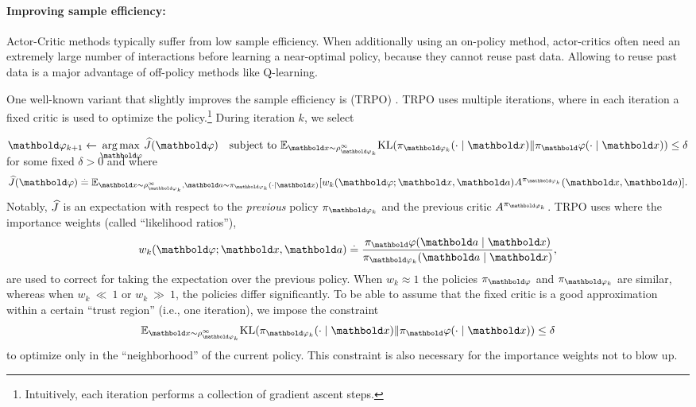 \paragraph{Improving sample efficiency:}

Actor-Critic methods typically suffer from low sample efficiency.
When additionally using an on-policy method, actor-critics often need an extremely large number of interactions before learning a near-optimal policy, because they cannot reuse past data.
Allowing to reuse past data is a major advantage of off-policy methods like Q-learning.

One well-known variant that slightly improves the sample efficiency is  (TRPO) \citep{schulman2015trust}.
TRPO uses multiple iterations, where in each iteration a fixed critic is used to optimize the policy.\footnote{Intuitively, each iteration performs a collection of gradient ascent steps.}
During iteration $k$, we select \begin{align}
  \vvarphi_{k+1} \gets \argmax_{\vvarphi} \J{\vvarphi} \quad \text{subject to}\ \E*[\vx \sim \rho_{\vvarphi_k}^\infty]{\KL{\pi_{\vvarphi_k}(\cdot \mid \vx)}{\pi_\vvarphi(\cdot \mid \vx)}} \leq \delta \label{eq:trpo} \\[-35pt] \nonumber
\end{align} for some fixed $\delta > 0$ and where \begin{align}
  \J{\vvarphi} \defeq \E[\vx \sim \rho_{\vvarphi_k}^\infty, \va \sim \pi_{\vvarphi_k}(\cdot \mid \vx)]{w_k(\vvarphi; \vx, \va) \A[\pi_{\vvarphi_k}]{\vx}{\va}}.
\end{align}
Notably, $\fnJ$ is an expectation with respect to the \emph{previous} policy $\pi_{\vvarphi_k}$ and the previous critic $\fnA[\pi_{\vvarphi_k}]$.
TRPO uses  where the importance weights (called ``likelihood ratios''), \begin{align*}
  w_k(\vvarphi; \vx, \va) \defeq \frac{\pi_\vvarphi(\va \mid \vx)}{\pi_{\vvarphi_k}(\va \mid \vx)},
\end{align*} are used to correct for taking the expectation over the previous policy.
When $w_k \approx 1$ the policies $\pi_{\vvarphi}$ and $\pi_{\vvarphi_k}$ are similar, whereas when $w_k~\ll~1$ or $w_k~\gg~1$, the policies differ significantly.
To be able to assume that the fixed critic is a good approximation within a certain ``trust region'' (i.e., one iteration), we impose the constraint \begin{align*}
  \E*[\vx \sim \rho_{\vvarphi_k}^\infty]{\KL{\pi_{\vvarphi_k}(\cdot \mid \vx)}{\pi_\vvarphi(\cdot \mid \vx)}} \leq \delta
\end{align*} to optimize only in the ``neighborhood'' of the current policy.
This constraint is also necessary for the importance weights not to blow up.

